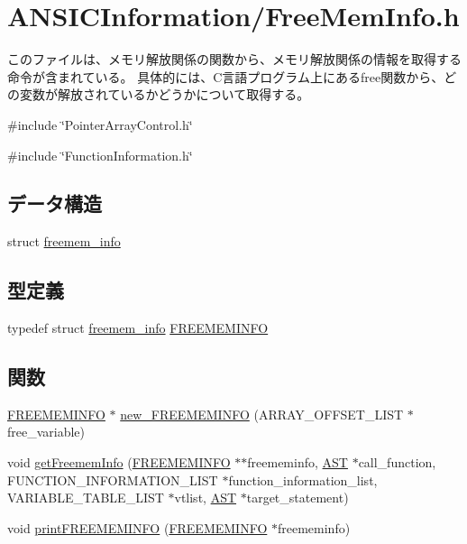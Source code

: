 \section{ANSICInformation/FreeMemInfo.h}
\label{FreeMemInfo_8h}


このファイルは、メモリ解放関係の関数から、メモリ解放関係の情報を取得する命令が含まれている。 具体的には、C言語プログラム上にあるfree関数から、どの変数が解放されているかどうかについて取得する。  


{\ttfamily \#include \char`\"{}PointerArrayControl.h\char`\"{}}\par
{\ttfamily \#include \char`\"{}FunctionInformation.h\char`\"{}}\par
\subsection*{データ構造}
\begin{DoxyCompactItemize}
\item 
struct \hyperlink{structfreemem__info}{freemem\_\-info}
\end{DoxyCompactItemize}
\subsection*{型定義}
\begin{DoxyCompactItemize}
\item 
typedef struct \hyperlink{structfreemem__info}{freemem\_\-info} \hyperlink{FreeMemInfo_8h_a9a97a736b52d4cbc7fdf9069a8caccb1}{FREEMEMINFO}
\end{DoxyCompactItemize}
\subsection*{関数}
\begin{DoxyCompactItemize}
\item 
\hyperlink{structfreemem__info}{FREEMEMINFO} $\ast$ \hyperlink{FreeMemInfo_8h_a7c3d2f791f8c0f22639a6c8eb31c71b7}{new\_\-FREEMEMINFO} (ARRAY\_\-OFFSET\_\-LIST $\ast$free\_\-variable)
\item 
void \hyperlink{FreeMemInfo_8h_a77d47b49aed920cf9c5bd24f364153dd}{getFreememInfo} (\hyperlink{structfreemem__info}{FREEMEMINFO} $\ast$$\ast$freememinfo, \hyperlink{structabstract__syntax__tree}{AST} $\ast$call\_\-function, FUNCTION\_\-INFORMATION\_\-LIST $\ast$function\_\-information\_\-list, VARIABLE\_\-TABLE\_\-LIST $\ast$vtlist, \hyperlink{structabstract__syntax__tree}{AST} $\ast$target\_\-statement)
\item 
void \hyperlink{FreeMemInfo_8h_ad4fd95936820494011ea2f39b9ea5fde}{printFREEMEMINFO} (\hyperlink{structfreemem__info}{FREEMEMINFO} $\ast$freememinfo)
\end{DoxyCompactItemize}


